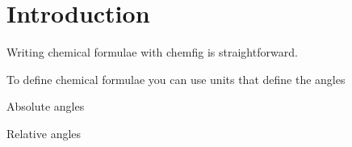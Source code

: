 \documentclass{article}
\begin{document}
	
	\section{Introduction}
	Writing chemical formulae with chemfig is straightforward.
	
	
	
	
	
	
	To define chemical formulae you can use units that define the angles
	
	
	Absolute angles
	
	
	Relative angles
	
\end{document}
